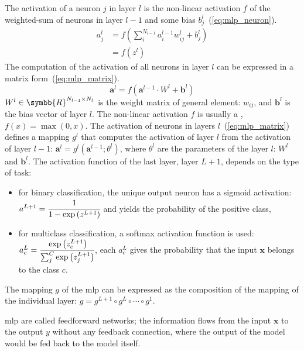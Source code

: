 \documentclass[../main.tex]{subfiles}
\begin{document}
		The activation of a neuron \(j\) in layer \(l\) is the non-linear activation \(f\) of the weighted-sum of neurons in layer \(l-1\) and some bias \(b_{j}^{l}\)~(\cref{eq:mlp_neuron}).
		\begin{align}
			a_{j}^{l} & = f\left(\sum_{i}^{N_{l-1}}a_{i}^{l-1}w_{ij}^{l} + b_{j}^{l} \right) \\ \label{eq:mlp_neuron}
			          & = f\left(z^{l}\right)
		\end{align}
		The computation of the activation of all neurons in layer \(l\) can be expressed in a matrix form~(\cref{eq:mlp_matrix}).
		\begin{equation}
			\symbf{a}^{l} = f\left( \symbf{a}^{l-1} \cdot W^l + \symbf{b}^{l} \right) \label{eq:mlp_matrix}
		\end{equation}
		\(W^l \in \symbb{R}^{N_{l-1} \times N_{l}}\) is the weight matrix of general element: \(w_{ij}\), and \(\symbf{b}^{l}\) is the bias vector of layer \(l\).
		The non-linear activation \(f\) is usually a , \(f\left(x\right) = \max\left(0, x\right)\).
		The activation of neurons in layers \(l\)~(\cref{eq:mlp_matrix}) defines a mapping \(g^{l}\) that computes the activation of layer \(l\) from the activation of layer \(l-1\): \( \symbf{a}^{l} = g^{l}\left(\symbf{a}^{l-1}; \theta^{l}\right)\), where \(\theta^{l}\) are the parameters of the layer \(l\): \(W^l\) and \( \symbf{b}^{l}\).
		The activation function of the last layer, layer \(L+1\), depends on the type of task:
		\begin{itemize}
			\item for binary classification, the unique output neuron has a sigmoid activation: \(a^{L+1} = \cfrac{1}{1-\exp\left(z^{L+1}\right)}\) and yields the probability of the positive class,
			\item for multiclass classification, a softmax activation function is used: \(a_{c}^{L} = \cfrac{\exp\left(z_{c}^{L+1}\right)}{\sum_{j}^{C}\exp\left(z_{j}^{L+1}\right)}\), each \(a_{c}^{L}\) gives the probability that the input \(\symbf{x}\) belongs to the class \(c\).
		\end{itemize}
		The mapping \(g\) of the \gls{mlp} can be expressed as the composition of the mapping of the individual layer: \(g = g^{L+1} \circ g^{L} \circ \cdots \circ g^{1}\).

		\Gls{mlp} are called feedforward networks; the information flows from the input \(\symbf{x}\) to the output \(y\) without any feedback connection, where the output of the model would be fed back to the model itself.
\end{document}
